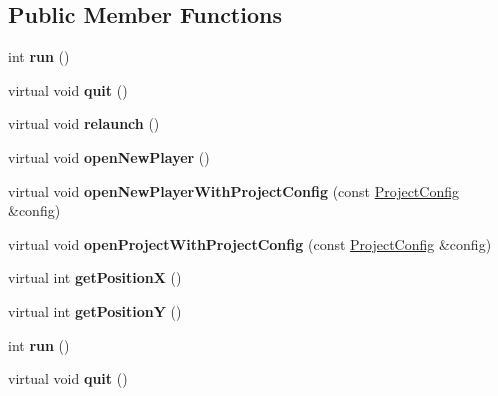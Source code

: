 \subsection*{Public Member Functions}
\begin{DoxyCompactItemize}
\item 
\mbox{\label{classSimulatorWin_a368a9f2b53d0f75440f5b7984f4007ba}} 
int {\bfseries run} ()
\item 
\mbox{\label{classSimulatorWin_ab2c658286c97baf5f53257a0f470901e}} 
virtual void {\bfseries quit} ()
\item 
\mbox{\label{classSimulatorWin_a99db366d2ae6209d417192ebde7641cb}} 
virtual void {\bfseries relaunch} ()
\item 
\mbox{\label{classSimulatorWin_a38c58b38c626dca084f21a506dda9f0e}} 
virtual void {\bfseries open\+New\+Player} ()
\item 
\mbox{\label{classSimulatorWin_a3d956039cbbaba42ffea480e060ae7e0}} 
virtual void {\bfseries open\+New\+Player\+With\+Project\+Config} (const \hyperlink{classProjectConfig}{Project\+Config} \&config)
\item 
\mbox{\label{classSimulatorWin_a0ecdebcdbf6d7a324184b8d48d44504d}} 
virtual void {\bfseries open\+Project\+With\+Project\+Config} (const \hyperlink{classProjectConfig}{Project\+Config} \&config)
\item 
\mbox{\label{classSimulatorWin_a8341006ad7e5511729952e821d6bad2e}} 
virtual int {\bfseries get\+PositionX} ()
\item 
\mbox{\label{classSimulatorWin_a25f273bec6b0c79a90df4b039e596a65}} 
virtual int {\bfseries get\+PositionY} ()
\item 
\mbox{\label{classSimulatorWin_a368a9f2b53d0f75440f5b7984f4007ba}} 
int {\bfseries run} ()
\item 
\mbox{\label{classSimulatorWin_a5c928514dd5212048c0e743e4864ef9a}} 
virtual void {\bfseries quit} ()

\end{DoxyCompactItemize}
